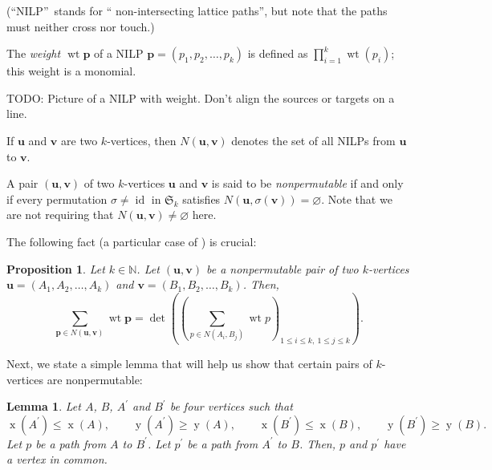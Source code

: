 \documentclass[reqno]{amsart}
\newcommand{\0}{\phantom{c}}
\let\sumnonlimits\sum
\let\prodnonlimits\prod
\renewcommand{\sum}{\sumnonlimits\limits}
\renewcommand{\prod}{\prodnonlimits\limits}
\newenvironment{verlong}{}{}
\newcommand{\defn}[1]{{\color{darkred}\emph{#1}}} %
\theoremstyle{plain}
\newtheorem{lemma}[thm]{Lemma}
\newtheorem{prop}[thm]{Proposition}
\theoremstyle{definition}
\numberwithin{equation}{section}
\begin{document}
(\textquotedblleft NILP\textquotedblright\ stands for \textquotedblleft
non-intersecting lattice paths\textquotedblright, but note that the paths must
neither cross nor touch.)

The \defn{weight $\operatorname{wt}\mathbf{p}$} of a NILP $\mathbf{p}=\left(
p_{1},p_{2},\ldots,p_{k}\right)  $ is defined as $\prod_{i=1}^{k}%
\operatorname*{wt}\left(  p_{i}\right)  $; this weight is a monomial.

TODO: Picture of a NILP with weight. Don't align the sources or targets on a line.

If $\mathbf{u}$ and $\mathbf{v}$ are two $k$-vertices, then
\defn{$N\left( \mathbf{u},\mathbf{v}\right)  $} denotes the set of all NILPs
from $\mathbf{u}$ to $\mathbf{v}$.

\begin{verlong}
A pair $\left(  \mathbf{u},\mathbf{v}\right)  $ of two $k$-vertices
$\mathbf{u}$ and $\mathbf{v}$ is said to be \defn{nonpermutable} if and only
if every permutation $\sigma\neq\operatorname*{id}$ in $\mathfrak{S}_{k}$
satisfies $N\left(  \mathbf{u},\sigma\left(  \mathbf{v}\right)  \right)
=\varnothing$. Note that we are not requiring that $N\left(  \mathbf{u}%
,\mathbf{v}\right)  \neq\varnothing$ here.

The following fact (a particular case of \cite[Corollary 2]{GesVie89}) is crucial:

\begin{prop}
\label{prop.LGV.nonper}Let $k\in\mathbb{N}$. Let $\left(  \mathbf{u}%
,\mathbf{v}\right)  $ be a nonpermutable pair of two $k$-vertices
$\mathbf{u}=\left(  A_{1},A_{2},\ldots,A_{k}\right)  $ and $\mathbf{v}=\left(
B_{1},B_{2},\ldots,B_{k}\right)  $. Then,%
\[
\sum_{\mathbf{p}\in N\left(  \mathbf{u},\mathbf{v}\right)  }\operatorname*{wt}%
\mathbf{p}=\det\left(  \left(  \sum_{p\in N\left(  A_{i},B_{j}\right)
}\operatorname*{wt}p\right)  _{1\leq i\leq k,\ 1\leq j\leq k}\right)  .
\]

\end{prop}

Next, we state a simple lemma that will help us show that certain pairs of
$k$-vertices are nonpermutable:

\begin{lemma}
\label{lem.LGV.hex}Let $A$, $B$, $A^{\prime}$ and $B^{\prime}$ be four
vertices such that%
\[
\operatorname*{x}\left(  A^{\prime}\right)  \leq\operatorname*{x}\left(
A\right)  ,\qquad\operatorname*{y}\left(  A^{\prime}\right)  \geq
\operatorname*{y}\left(  A\right)  ,\qquad\operatorname*{x}\left(  B^{\prime
}\right)  \leq\operatorname*{x}\left(  B\right)  ,\qquad\operatorname*{y}%
\left(  B^{\prime}\right)  \geq\operatorname*{y}\left(  B\right)  .
\]
Let $p$ be a path from $A$ to $B^{\prime}$. Let $p^{\prime}$ be a path from
$A^{\prime}$ to $B$. Then, $p$ and $p^{\prime}$ have a vertex in common.
\end{lemma}


\end{verlong}
\end{document}
